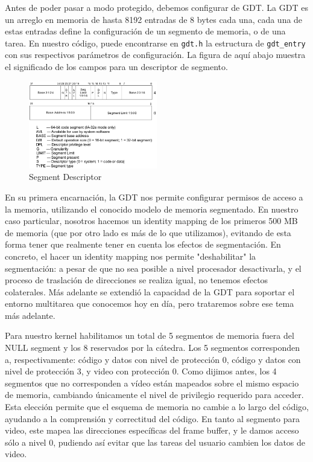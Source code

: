 Antes de poder pasar a modo protegido, debemos configurar de GDT. La GDT es un arreglo en memoria de hasta 8192 entradas de 8 bytes cada una, cada una de estas entradas define la configuración de un segmento de memoria, o de una tarea. En nuestro código, puede encontrarse en \texttt{gdt.h} la estructura de \texttt{gdt\_entry} con sus respectivos parámetros de configuración. La figura de aquí abajo muestra el significado de los campos para un descriptor de segmento.

\begin{figure}[h!]
  \centering
    \includegraphics[width=0.5\textwidth]{images/segment_descriptor}
  \caption{Segment Descriptor}
\end{figure}

En su primera encarnación, la GDT nos permite configurar permisos de acceso a la memoria, utilizando el conocido modelo de memoria segmentado. En nuestro caso particular, nosotros hacemos un identity mapping de los primeros 500 MB de memoria (que por otro lado es más de lo que utilizamos), evitando de esta forma tener que realmente tener en cuenta los efectos de segmentación. En concreto, el hacer un identity mapping nos permite "deshabilitar" la segmentación: a pesar de que no sea posible a nivel procesador desactivarla, y el proceso de traslación de direcciones se realiza igual, no tenemos efectos colaterales. Más adelante se extendió la capacidad de la GDT para soportar el entorno multitarea que conocemos hoy en día, pero trataremos sobre ese tema más adelante.

Para nuestro kernel habilitamos un total de 5 segmentos de memoria fuera del NULL segment y los 8 reservados por la cátedra. Los 5 segmentos corresponden a, respectivamente: código y datos con nivel de protección 0, código y datos con nivel de protección 3, y video con protección 0. Como dijimos antes, los 4 segmentos que no corresponden a vídeo están mapeados sobre el mismo espacio de memoria, cambiando únicamente el nivel de privilegio requerido para acceder. Esta elección permite que el esquema de memoria no cambie a lo largo del código, ayudando a la comprensión y correctitud del código. En tanto al segmento para video, este mapea las direcciones específicas del frame buffer, y le damos acceso sólo a nivel 0, pudiendo así evitar que las tareas del usuario cambien los datos de video.

